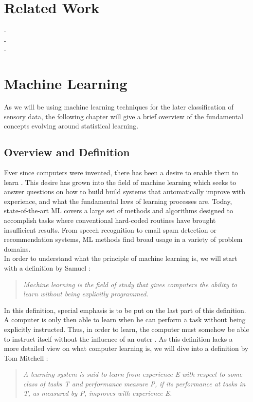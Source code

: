 \section{Related Work}


- \cite{Tapprints} \\
- \cite{Accessory} \\
- \cite{Touchlogger} \\

\newpage
\section{Machine Learning \label{sec:fieldstudy}}
As we will be using machine learning techniques for the later classification of sensory data, the following chapter will give a brief overview of the fundamental concepts evolving around statistical learning.

\subsection{Overview and Definition}

Ever since computers were invented, there has been a desire to enable them to learn \cite{samuel2000some}. This desire has grown into the field of machine learning which seeks to answer questions on how to build build systems that automatically improve with experience, and what the fundamental laws of learning processes are. Today, state-of-the-art ML covers a large set of methods and algorithms designed to accomplish tasks where conventional hard-coded routines have brought insufficient results. From speech recognition to email spam detection or recommendation systems, ML methods find broad usage in a variety of problem domains. \\

In order to understand what the principle of machine learning is, we will start with a definition by Samuel \cite{samuel2000some}:\\
\begin{quote}
\textit{Machine learning is the field of study that gives computers the ability to learn without being explicitly programmed.}\\
\end{quote}

In this definition, special emphasis is to be put on the last part of this definition. A computer is only then able to learn when he can perform a task without being explicitly instructed. Thus, in order to learn, the computer must somehow be able to instruct itself without the influence of an outer . As this definition lacks a more detailed view on what computer learning is, we will dive into a definition by Tom Mitchell \cite{mitchell2006discipline}:\\
\begin{quote}
\textit{A learning system is said to learn from experience E with respect to some class of tasks T and performance measure P, if its performance at tasks in T, as measured by P, improves with experience E.}\\
\end{quote}

